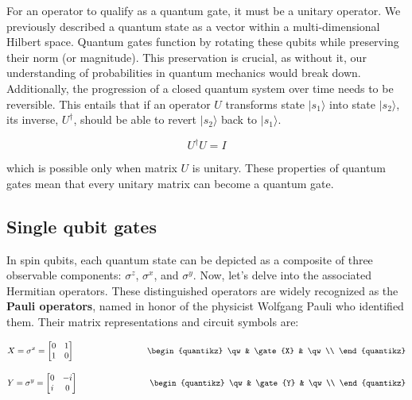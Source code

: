 \documentclass[12pt,a4paper]{report}
\begin{document}
\noindent
For an operator to qualify as a quantum gate, it must be a unitary operator. We previously described a quantum state as a vector within a multi-dimensional Hilbert space. Quantum gates function by rotating these qubits while preserving their norm (or magnitude). This preservation is crucial, as without it, our understanding of probabilities in quantum mechanics would break down. Additionally, the progression of a closed quantum system over time needs to be reversible. This entails that if an operator \( U \) transforms state \( |s_1\rangle \) into state \( |s_2\rangle \), its inverse, \(U^{\dagger}\), should be able to revert \( |s_2\rangle \) back to \( |s_1\rangle \).


\[ U^{\dagger} U = I \]

\noindent
which is possible only when matrix \( U \) is unitary. These properties of quantum gates mean that every unitary matrix can become a quantum gate.

\subsection{Single qubit gates}

\noindent
In spin qubits, each quantum state can be depicted as a composite of three observable components: \( \sigma^{z} \), \( \sigma^{x} \), and \( \sigma^{y} \). Now, let's delve into the associated Hermitian operators. These distinguished operators are widely recognized as the \textbf{Pauli operators}, named in honor of the physicist Wolfgang Pauli who identified them. Their matrix representations and circuit symbols are:

\[
X = \sigma^x = \begin{bmatrix}
0 & 1 \\
1 & 0 \\
\end{bmatrix}
\hspace{3cm}
\begin{quantikz}
\qw & \gate{X} & \qw \\
\end{quantikz}
\]

\[
Y = \sigma^y = \begin{bmatrix}
0 & -i \\
i & 0 \\
\end{bmatrix}
\hspace{3cm}
\begin{quantikz}
\qw & \gate{Y} & \qw \\
\end{quantikz}
\]
\end{document}
